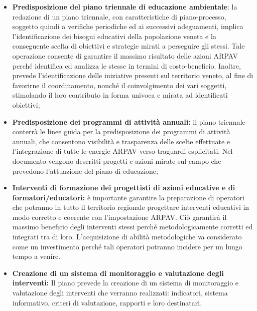\begin{itemize}

\item \textbf{Predisposizione del piano triennale di educazione ambientale}:
la redazione di un piano triennale, con caratteristiche di piano-processo, soggetto quindi a verifiche periodiche ed ai successivi adeguamenti, implica l'identificazione dei bisogni educativi della popolazione veneta e la conseguente scelta di obiettivi e strategie mirati a perseguire gli stessi. Tale operazione consente di garantire il massimo risultato delle azioni ARPAV perché identifica ed analizza le stesse in termini di costo-beneficio. Inoltre, prevede l'identificazione delle iniziative presenti sul territorio veneto, al fine di favorirne il coordinamento, nonché il coinvolgimento dei vari soggetti, stimolando il loro contributo in forma univoca e mirata ad identificati obiettivi;

\item \textbf{Predisposizione dei programmi di attività annuali:}
il piano triennale conterrà le linee guida per la predisposizione dei programmi di attività annuali, che consentono visibilità e trasparenza delle scelte effettuate e l'integrazione di tutte le energie ARPAV verso traguardi esplicitati. Nel documento vengono descritti progetti e azioni mirate sul campo che prevedono l'attuazione del piano di educazione;

\item \textbf{Interventi di formazione dei progettisti di azioni educative e di formatori/educatori:}
è importante garantire la preparazione di operatori che potranno in tutto il territorio regionale progettare interventi educativi in modo corretto e coerente con l'impostazione ARPAV. Ciò garantirà il massimo beneficio degli interventi stessi perché metodologicamente corretti ed integrati tra di loro. L'acquisizione di abilità metodologiche va considerato come un investimento perché tali operatori potranno incidere per un lungo tempo a venire.

\item \textbf{Creazione di un sistema di monitoraggio e valutazione degli interventi:}
Il piano prevede la creazione di un sistema di monitoraggio e valutazione degli interventi che verranno realizzati: indicatori, sistema informativo, criteri di valutazione, rapporti e loro destinatari.

\end{itemize}